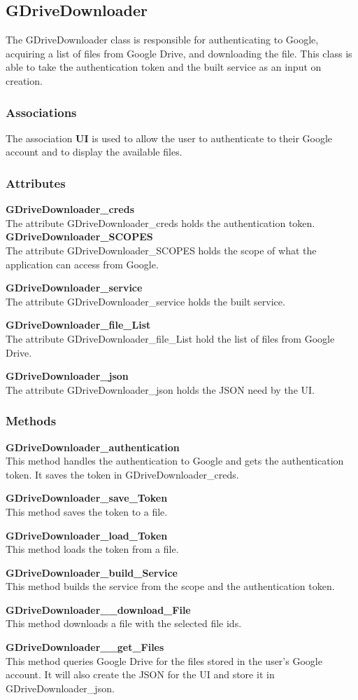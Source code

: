 \subsection{GDriveDownloader}
The GDriveDownloader class is responsible for authenticating to Google, acquiring a list of files from Google Drive, and downloading the file.
This class is able to take the authentication token and the built service as an input on creation.  
\subsubsection{Associations}
The association \textbf{UI} is used to allow the user to authenticate to their Google account and to display the available files.
\subsubsection{Attributes}
\textbf{GDriveDownloader\_creds} \\
The attribute GDriveDownloader\_creds holds the authentication token.
\textbf{GDriveDownloader\_SCOPES} \\
The attribute GDriveDownloader\_SCOPES holds the scope of what the application can access from Google.

\textbf{GDriveDownloader\_service} \\
The attribute GDriveDownloader\_service holds the built service.

\textbf{GDriveDownloader\_file\_List} \\
The attribute GDriveDownloader\_file\_List hold the list of files from Google Drive.

\textbf{GDriveDownloader\_json} \\
The attribute GDriveDownloader\_json holds the JSON need by the UI. 
\subsubsection{Methods}
\textbf{GDriveDownloader\_authentication} \\
This method handles the authentication to Google and gets the authentication token. It saves the token in GDriveDownloader\_creds.

\textbf{GDriveDownloader\_save\_Token} \\
This method saves the token to a file.

\textbf{GDriveDownloader\_load\_Token} \\
This method loads the token from a file.

\textbf{GDriveDownloader\_build\_Service} \\
This method builds the service from the scope and the authentication token.

\textbf{GDriveDownloader\_\_download\_File} \\
This method downloads a file with the selected file ids. 

\textbf{GDriveDownloader\_\_get\_Files} \\
This method queries Google Drive for the files stored in the user's Google account. It will also create the JSON for the UI and store it in GDriveDownloader\_json.   

